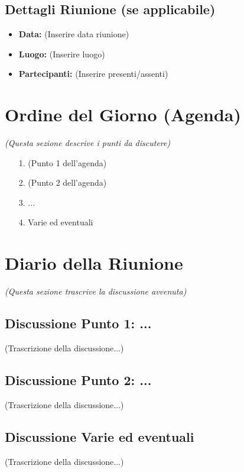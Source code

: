 \documentclass[a4paper, 11pt, oneside]{scrartcl} %
\begin{document}
\subsection{Dettagli Riunione (se applicabile)}
\begin{itemize}
    \item \textbf{Data:} (Inserire data riunione)
    \item \textbf{Luogo:} (Inserire luogo)
    \item \textbf{Partecipanti:} (Inserire presenti/assenti)
\end{itemize}


\newpage
\section{Ordine del Giorno (Agenda)}
\emph{(Questa sezione descrive i punti da discutere)}

\begin{itemize}
    \item[1.] (Punto 1 dell'agenda)
    \item[2.] (Punto 2 dell'agenda)
    \item[3.] ...
    \item[4.] Varie ed eventuali
\end{itemize}

\newpage
\section{Diario della Riunione}
\emph{(Questa sezione trascrive la discussione avvenuta)}

\subsection{Discussione Punto 1: ...}
(Trascrizione della discussione...)

\subsection{Discussione Punto 2: ...}
(Trascrizione della discussione...)

\subsection{Discussione Varie ed eventuali}
(Trascrizione della discussione...)
\end{document}
